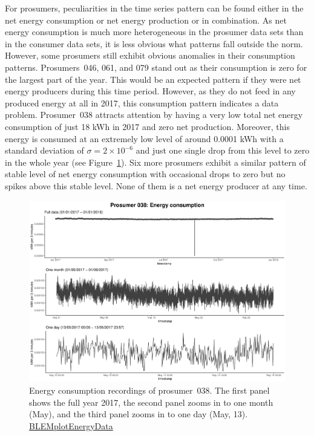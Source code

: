 For prosumers, peculiarities in the time series pattern can be found either in the net energy consumption or net energy production or in combination. As net energy consumption is much more heterogeneous in the prosumer data sets than in the consumer data sets, it is less obvious what patterns fall outside the norm. However, some prosumers still exhibit obvious anomalies in their consumption patterns. Prosumers~046, 061, and 079 stand out as their consumption is zero for the largest part of the year. This would be an expected pattern if they were net energy producers during this time period. However, as they do not feed in any produced energy at all in 2017, this consumption pattern indicates a data problem. 
Prosumer~038 attracts attention by having a very low total net energy consumption of just 18 kWh in 2017 and zero net production. Moreover, this energy is consumed at an extremely low level of around 0.0001 kWh with a standard deviation of $\sigma=2\times10^{-6}$ and just one single drop from this level to zero in the whole year (see Figure~\ref{Fig:energycons_p038}). Six more prosumers exhibit a similar pattern of stable level of net energy consumption with occasional drops to zero but no spikes above this stable level. None of them is a net energy producer at any time.

\begin{figure}[htbp]
 \centering
\includegraphics[width=\textwidth]{thesis/graphs/timeseries/p038_cons.pdf}
\caption[Energy consumption recordings of prosumer 038]{Energy consumption recordings of prosumer~038. The first panel shows the full year 2017, the second panel zooms in to one month (May), and the third panel zooms in to one day (May, 13). \quantnet\href{https://github.com/QuantLet/BLEM/tree/master/BLEMplotEnergyData}{BLEMplotEnergyData}}
\label{Fig:energycons_p038}
\end{figure}

